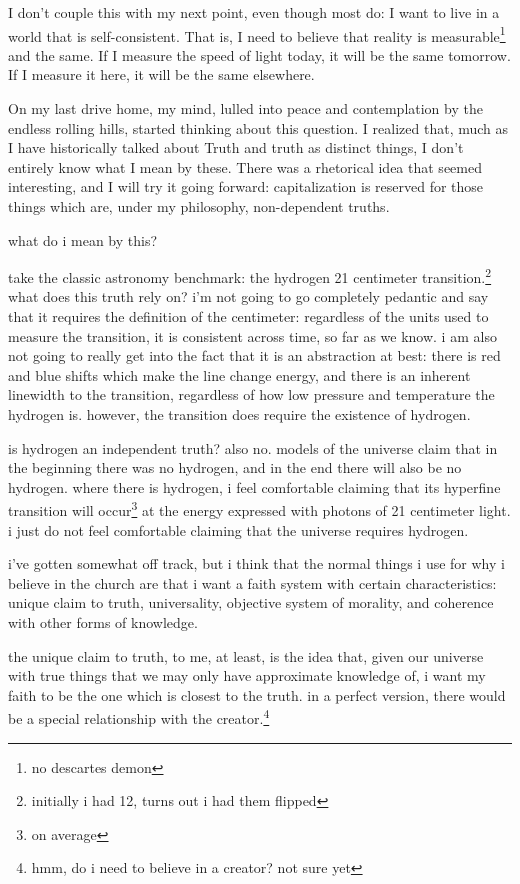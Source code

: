 \documentclass[12pt]{article}
\renewcommand{\,}{\textsuperscript{,}}
\begin{document}
I don't couple this with my next point, even though most do: I want to live in a world that is self-consistent.  
That is, I need to believe that reality is measurable\footnote{no descartes demon} and the same.  
If I measure the speed of light today, it will be the same tomorrow.  
If I measure it here, it will be the same elsewhere.

On my last drive home, my mind, lulled into peace and contemplation by the endless rolling hills, started thinking about this question.  
I realized that, much as I have historically talked about Truth and truth as distinct things, I don't entirely know what I mean by these.  
There was a rhetorical idea that seemed interesting, and I will try it going forward: capitalization is reserved for those things which are, under my philosophy, non-dependent truths.

what do i mean by this?

take the classic astronomy benchmark: the hydrogen 21 centimeter transition.\footnote{initially i had 12, turns out i had them flipped}  
what does this truth rely on?  
i'm not going to go completely pedantic and say that it requires the definition of the centimeter: regardless of the units used to measure the transition, it is consistent across time, so far as we know.  
i am also not going to really get into the fact that it is an abstraction at best: there is red and blue shifts which make the line change energy, and there is an inherent linewidth to the transition, regardless of how low pressure and temperature the hydrogen is.  
however, the transition does require the existence of hydrogen.

is hydrogen an independent truth?  
also no.  
models of the universe claim that in the beginning there was no hydrogen, and in the end there will also be no hydrogen.  
where there is hydrogen, i feel comfortable claiming that its hyperfine transition will occur\footnote{on average} at the energy expressed with photons of 21 centimeter light.  
i just do not feel comfortable claiming that the universe requires hydrogen.

i've gotten somewhat off track, but i think that the normal things i use for why i believe in the church are that i want a faith system with certain characteristics: unique claim to truth, universality, objective system of morality, and coherence with other forms of knowledge.

the unique claim to truth, to me, at least, is the idea that, given our universe with true things that we may only have approximate knowledge of, i want my faith to be the one which is closest to the truth.  
in a perfect version, there would be a special relationship with the creator.\footnote{hmm, do i need to believe in a creator? not sure yet}
\end{document}
